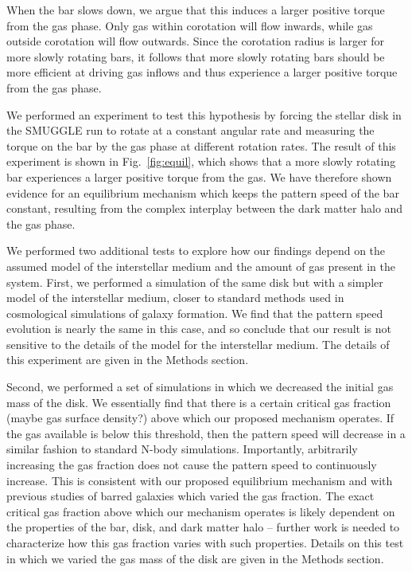 \documentclass{natureprintstyle}
\begin{document}
When the bar slows down, we argue that this induces a larger positive torque
from the gas phase. Only gas within corotation will flow inwards, while gas
outside corotation will flow outwards.\cite{2011MNRAS.415.1027H} Since the
corotation radius is larger for more slowly rotating bars, it follows that
more slowly rotating bars should be more efficient at driving gas inflows and
thus experience a larger positive torque from the gas phase.

We performed an experiment to test this hypothesis by forcing the stellar disk
in the SMUGGLE run to rotate at a constant angular rate and measuring the
torque on the bar by the gas phase at different rotation rates. The result of
this experiment is shown in Fig.~\ref{fig:equil}, which shows that a more
slowly rotating bar experiences a larger positive torque from the gas. We have
therefore shown evidence for an equilibrium mechanism which keeps the pattern
speed of the bar constant, resulting from the complex interplay between the
dark matter halo and the gas phase.

We performed two additional tests to explore how our findings depend on the
assumed model of the interstellar medium and the amount of gas present in the
system. First, we performed a simulation of the same disk but with a simpler
model of the interstellar medium\cite{2003MNRAS.339..289S}, closer to standard
methods used in cosmological simulations of galaxy formation. We find that the
pattern speed evolution is nearly the same in this case, and so conclude that
our result is not sensitive to the details of the model for the interstellar
medium. The details of this experiment are given in the Methods section.

Second, we performed a set of simulations in which we decreased the initial
gas mass of the disk. We essentially find that there is a certain critical gas
fraction (maybe gas surface density?) above which our proposed mechanism
operates. If the gas available is below this threshold, then the pattern speed
will decrease in a similar fashion to standard N-body simulations.
Importantly, arbitrarily increasing the gas fraction does not cause the
pattern speed to continuously increase. This is consistent with our proposed
equilibrium mechanism and with previous studies of barred galaxies which
varied the gas fraction.\cite{2010ApJ...719.1470V} The exact critical gas
fraction above which our mechanism operates is likely dependent on the
properties of the bar, disk, and dark matter halo -- further work is needed to
characterize how this gas fraction varies with such properties. Details on
this test in which we varied the gas mass of the disk are given in the Methods
section.
\end{document}
